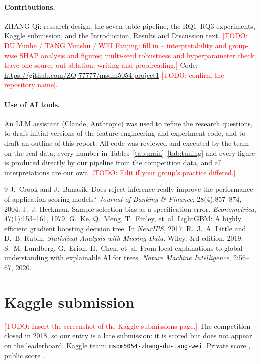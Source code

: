 \documentclass[10pt]{article}
\newcommand{\todo}[1]{\textcolor{red}{[TODO: #1]}}
\begin{document}
\paragraph{Contributions.} ZHANG Qi: research design, the seven-table pipeline, the RQ1--RQ3 experiments, Kaggle submission, and the Introduction, Results and Discussion text. \todo{DU Yunhe / TANG Yunshu / WEI Fanjing: fill in -- interpretability and group-wise SHAP analysis and figures; multi-seed robustness and hyperparameter check; leave-one-source-out ablation; writing and proofreading.} Code: \url{https://github.com/ZQ-77777/msdm5054-project1} \todo{confirm the repository name}.

\paragraph{Use of AI tools.} An LLM assistant (Claude, Anthropic) was used to refine the research questions, to draft initial versions of the feature-engineering and experiment code, and to draft an outline of this report. All code was reviewed and executed by the team on the real data; every number in Tables~\ref{tab:main}--\ref{tab:tuning} and every figure is produced directly by our pipeline from the competition data, and all interpretations are our own. \todo{Edit if your group's practice differed.}


\begin{thebibliography}{9}
 J.~Crook and J.~Banasik. Does reject inference really improve the performance of application scoring models? \emph{Journal of Banking \& Finance}, 28(4):857--874, 2004.
 J.~J. Heckman. Sample selection bias as a specification error. \emph{Econometrica}, 47(1):153--161, 1979.
 G.~Ke, Q.~Meng, T.~Finley, et~al. LightGBM: A highly efficient gradient boosting decision tree. In \emph{NeurIPS}, 2017.
 R.~J.~A. Little and D.~B. Rubin. \emph{Statistical Analysis with Missing Data}. Wiley, 3rd edition, 2019.
 S.~M. Lundberg, G.~Erion, H.~Chen, et~al. From local explanations to global understanding with explainable AI for trees. \emph{Nature Machine Intelligence}, 2:56--67, 2020.
\end{thebibliography}

\appendix
\section{Kaggle submission}
\todo{Insert the screenshot of the Kaggle submissions page.} The competition closed in 2018, so our entry is a late submission: it is scored but does not appear on the leaderboard. Kaggle team: \texttt{msdm5054-zhang-du-tang-wei}. Private score \KagglePrivate{}, public score \KagglePublic{}.
\end{document}
